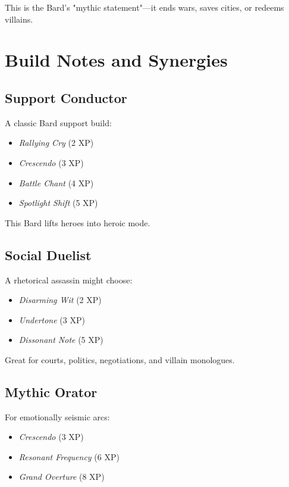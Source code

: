 \documentclass[11pt]{book}
\begin{document}
This is the Bard's "mythic statement"---it ends wars, saves cities,
or redeems villains.

\section{Build Notes and Synergies}

\subsection{Support Conductor}

A classic Bard support build:
\begin{itemize}
  \item \emph{Rallying Cry} (2 XP)
  \item \emph{Crescendo} (3 XP)
  \item \emph{Battle Chant} (4 XP)
  \item \emph{Spotlight Shift} (5 XP)
\end{itemize}

This Bard lifts heroes into heroic mode.

\subsection{Social Duelist}

A rhetorical assassin might choose:
\begin{itemize}
  \item \emph{Disarming Wit} (2 XP)
  \item \emph{Undertone} (3 XP)
  \item \emph{Dissonant Note} (5 XP)
\end{itemize}

Great for courts, politics, negotiations, and villain monologues.

\subsection{Mythic Orator}

For emotionally seismic arcs:
\begin{itemize}
  \item \emph{Crescendo} (3 XP)
  \item \emph{Resonant Frequency} (6 XP)
  \item \emph{Grand Overture} (8 XP)
\end{itemize}
\end{document}
